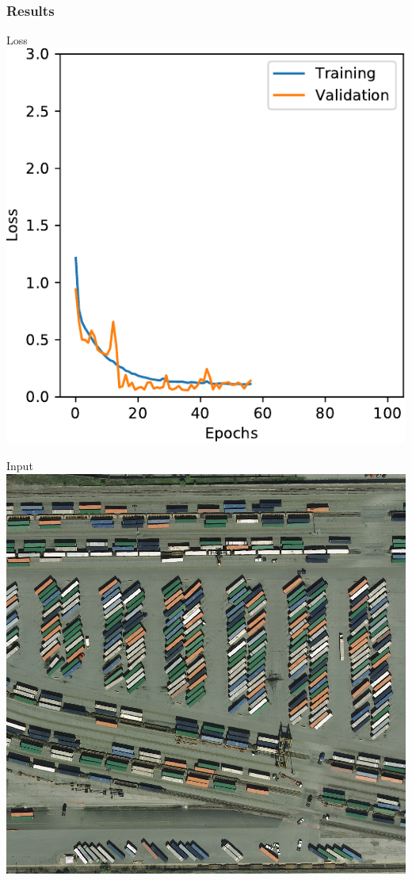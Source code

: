 \documentclass[usenames,dvipsnames,10pt]{beamer}
\begin{document}
\begin{frame}
\frametitle{Results}
\begin{minipage}[]{0.3\textwidth}
	\centering
	Loss
	\includegraphics[width=\textwidth]{graphics/loss04.pdf}
\end{minipage}
\hspace{0.25cm}
\begin{minipage}[]{0.3\textwidth}
	\centering
	Input
	\includegraphics[width=\textwidth]{graphics/aerial04.jpg}

\end{minipage}
\end{frame}
\end{document}
